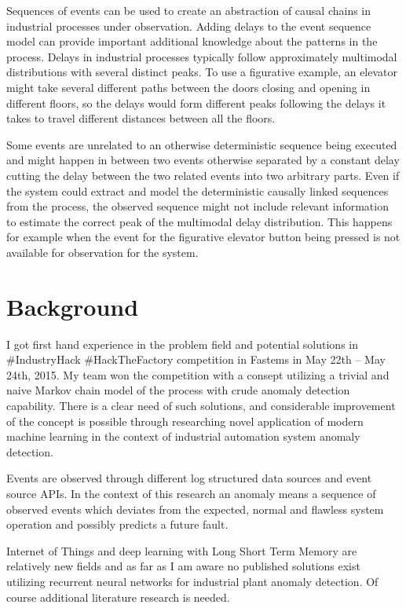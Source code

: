 \documentclass[a4paper,10pt]{article}
\begin{document}
Sequences of events can be used to create an abstraction of causal chains in industrial processes under observation. Adding delays to the event sequence model can provide important
additional knowledge about the patterns in the process. Delays in industrial processes typically follow approximately multimodal distributions with several distinct peaks.
To use a figurative example, an elevator might take several different paths between the doors closing and opening in different floors, so the delays would form different
peaks following the delays it takes to travel different distances between all the floors.

Some events are unrelated to an otherwise deterministic sequence being executed
and might happen in between two events otherwise separated by a constant delay cutting the delay between the two related events into two arbitrary parts.
Even if the system could extract and model the deterministic causally linked sequences from the process,
the observed sequence might not include relevant information to estimate the correct peak of the multimodal delay distribution.
This happens for example when the event for the figurative elevator button being pressed is not available for observation for the system.

\section{Background}

I got first hand experience in the problem field and potential solutions in \#IndustryHack \#HackTheFactory competition in Fastems in May 22th – May 24th, 2015\cite{IndustryHack}.
My team won the competition with a consept utilizing a trivial and naive Markov chain model of the process with crude anomaly detection capability.
There is a clear need of such solutions, and considerable improvement of the concept is possible through researching novel application of modern machine learning in the context
of industrial automation system anomaly detection.

Events are observed through different log structured data sources and event source APIs. In the context of this research an anomaly means a sequence of observed events which
deviates from the expected, normal and flawless system operation and possibly predicts a future fault.

Internet of Things and deep learning with Long Short Term Memory are relatively new fields and as far as I am aware no published solutions exist utilizing
recurrent neural networks for industrial plant anomaly detection. Of course additional literature research is needed.
\end{document}
